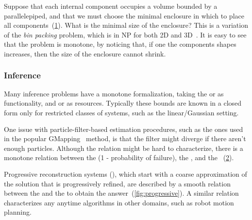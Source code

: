 \begin{example}
    Suppose that each internal component occupies a volume bounded by a parallelepiped, and that we must choose the minimal enclosure in which to place all components~(\cref{fig:packing}).
    What is the minimal size of the enclosure?
    This is a variation of the \emph{bin packing} problem, which is in NP for both 2D and 3D~\cite{lodi02two}.
    It is easy to see that the problem is monotone, by noticing that, if one the components shapes increases, then the size of the enclosure cannot shrink.
\end{example}
\begin{figure}[tbh]
    \centering
    \caption{}
    \label{fig:packing}
\end{figure}

\subsubsection{Inference}

Many inference problems have a monotone formalization, taking the
 or  as functionality, and 
or  as resources.
Typically these bounds are known in a closed form only for restricted classes of systems, such as the linear/Gaussian setting.

\begin{example}[SLAM]
    One issue with particle-filter-based estimation procedures, such as the ones used in the popular GMapping~\cite{grisetti07improved}
    method, is that the filter might diverge if there aren't enough particles.
    Although the relation might be hard to characterize, there is a monotone relation between the  (1 - probability of failure), the , and the ~(\cref{fig:gmapping}).
\end{example}
\begin{figure}[h]
    \centering
    \caption{}
    \label{fig:gmapping}
\end{figure}

\begin{example}
    Progressive reconstruction systems (\cite{locher16progressive}), which start with a coarse approximation of the solution that is progressively refined, are described by a smooth relation between the  and the  to obtain the answer~(\cref{fig:progressive}).
    A similar relation characterizes any anytime algorithms in other domains, such as robot motion planning.
\end{example}

